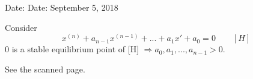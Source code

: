 \documentclass[twoside]{article}
\begin{document}

\hfill Date: Date: September 5, 2018

\begin{theorem}
    Consider \begin{equation}
        x^{(n)} + a_{n-1} x^{(n-1)} + ... + a_1 x' + a_0 = 0 \qquad [H]
    \end{equation}
    0 is a stable equilibrium point of [H] $\Longrightarrow a_0, a_1, ..., a_{n-1} > 0$.
\end{theorem}
\begin{theorem}
    See the scanned page.
\end{theorem}
\end{document}

